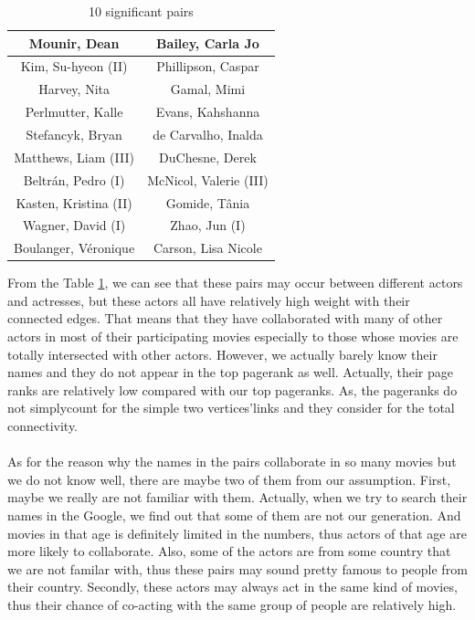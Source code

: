 \documentclass{article}
\begin{document}
\begin {table}[htbp]
\caption{10 significant pairs}
\begin{adjustbox}{center}
\label{tb:3_3}
\begin{tabular}{|c|c|}
\hline
Mounir, Dean &  Bailey, Carla Jo\\
\hline
Kim, Su-hyeon (II) & Phillipson, Caspar \\
\hline
Harvey, Nita & Gamal, Mimi \\
\hline
Perlmutter, Kalle & Evans, Kahshanna \\
\hline
Stefancyk, Bryan & de Carvalho, Inalda \\
\hline
Matthews, Liam (III) & DuChesne, Derek \\
\hline
Beltrán, Pedro (I) & McNicol, Valerie (III) \\
\hline
Kasten, Kristina (II) & Gomide, Tânia \\
\hline
Wagner, David (I)& Zhao, Jun (I) \\
\hline
Boulanger, Véronique & Carson, Lisa Nicole \\
\hline
\end{tabular}
\end{adjustbox}
\end{table}
From the Table \ref{tb:3_3}, we can see that these pairs may occur between different actors and  actresses, but these actors all have relatively high weight with their connected edges. That means that they have collaborated with many of other actors in most of their participating movies especially to those whose movies are totally intersected with other actors. However, we actually barely know their names and they do not appear in the top pagerank as well. Actually, their page ranks are relatively low compared with our top pageranks. As, the pageranks do not simplycount for the simple two vertices'links and they consider for the total connectivity.\\
\\
As for the reason why the names in the pairs collaborate in so many movies but we do not know well, there are maybe two of them from our assumption. First, maybe we really are not familiar with them. Actually, when we try to search their names in the Google, we find out that some of them are not our generation. And movies in that age is definitely limited in the numbers, thus actors of that age are more likely to collaborate. Also, some of the actors are from some country that we are not familar with, thus these pairs may sound pretty famous to people from their country. Secondly, these actors may always act in the same kind of movies, thus their chance of co-acting with the same group of people are relatively high.
\end{document}
